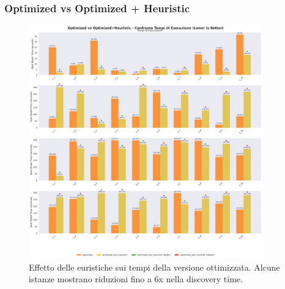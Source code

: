 \documentclass[11pt,a4paper]{article}
\begin{document}
\subsubsection{Optimized vs Optimized + Heuristic}
\begin{figure}[H]
  \centering
  \includegraphics[width=0.9\textwidth]{../Results/graphs/time_comparison_optimized_vs_optimized_heuristic.png}
  \caption{Effetto delle euristiche sui tempi della versione ottimizzata. 
  Alcune istanze mostrano riduzioni fino a 6x nella discovery time.}
\end{figure}
\end{document}
